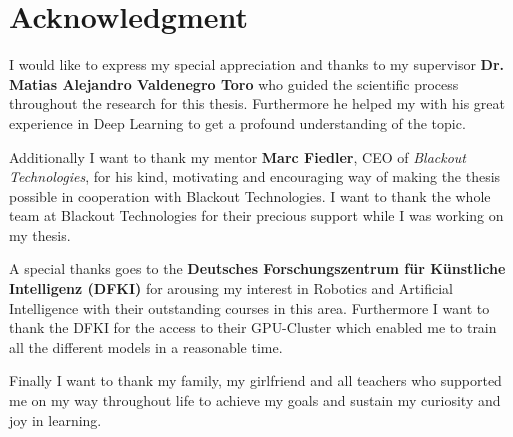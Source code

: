 \chapter{Acknowledgment}
I would like to express my special appreciation and thanks to my supervisor \textbf{Dr. Matias Alejandro Valdenegro Toro} who guided the scientific process throughout the research for this thesis.
Furthermore he helped my with his great experience in Deep Learning to get a profound understanding of the topic.

Additionally I want to thank my mentor \textbf{Marc Fiedler}, CEO of \emph{Blackout Technologies}, for his kind, motivating and encouraging way of making the thesis possible in cooperation with Blackout Technologies. I want to thank the whole team at Blackout Technologies for their precious support while I was working on my thesis.

A special thanks goes to the \textbf{Deutsches Forschungszentrum für Künstliche Intelligenz (DFKI)} for arousing my interest in Robotics and Artificial Intelligence with their outstanding courses in this area.
Furthermore I want to thank the DFKI for the access to their GPU-Cluster which enabled me to train all the different models in a reasonable time.

Finally I want to thank my family, my girlfriend and all teachers who supported me on my way throughout life to achieve my goals and sustain my curiosity and joy in learning.






